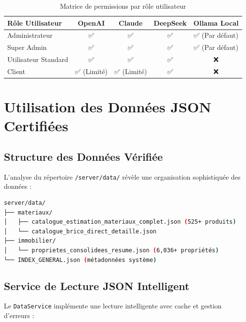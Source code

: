 \begin{table}[H]
\centering
\caption{Matrice de permissions par rôle utilisateur}
\begin{tabular}{|l|c|c|c|c|}
\hline
\textbf{Rôle Utilisateur} & \textbf{OpenAI} & \textbf{Claude} & \textbf{DeepSeek} & \textbf{Ollama Local} \\
\hline
Administrateur & ✅ & ✅ & ✅ & ✅ (Par défaut) \\
\hline
Super Admin & ✅ & ✅ & ✅ & ✅ (Par défaut) \\
\hline
Utilisateur Standard & ✅ & ✅ & ✅ & ❌ \\
\hline
Client & ✅ (Limité) & ✅ (Limité) & ✅ & ❌ \\
\hline
\end{tabular}
\end{table}

\section{Utilisation des Données JSON Certifiées}

\subsection{Structure des Données Vérifiée}

L'analyse du répertoire \texttt{/server/data/} révèle une organisation sophistiquée des données :

\begin{lstlisting}[language=bash, caption=Structure des données JSON certifiées]
server/data/
├── materiaux/
│   ├── catalogue_estimation_materiaux_complet.json (525+ produits)
│   └── catalogue_brico_direct_detaille.json
├── immobilier/
│   └── proprietes_consolidees_resume.json (6,036+ propriétés)
└── INDEX_GENERAL.json (métadonnées système)
\end{lstlisting}

\subsection{Service de Lecture JSON Intelligent}

Le \texttt{DataService} implémente une lecture intelligente avec cache et gestion d'erreurs :

